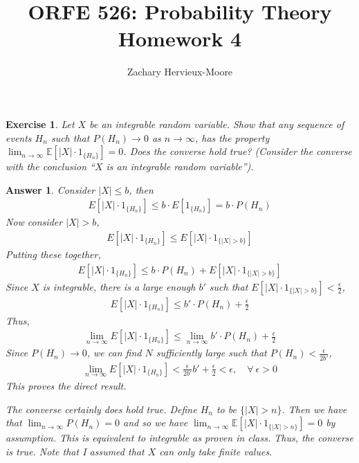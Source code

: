\documentclass[12pt]{article}
\title{ORFE 526: Probability Theory \\ Homework 4}
\author{Zachary Hervieux-Moore}
\date{\displaydate{date}}
\theoremstyle{colon}
\newtheorem{exercise}{Exercise}
\newtheorem*{answer}{Answer}
\begin{document}
\maketitle

\clearpage

\begin{exercise}
  Let $X$ be an integrable random variable. Show that any sequence of events $H_n$ such that $P(H_n) \rightarrow 0$ as $n \rightarrow \infty$, has the property $\lim_{n \rightarrow \infty} \mathbb{E}[\lvert X \rvert \cdot 1_{\{H_n\}}] = 0$. Does the converse hold true? (Consider the converse with the conclusion ``$X$ is an integrable random variable'').
\end{exercise}

\begin{answer}
  Consider $\lvert X \rvert \leq b$, then
  \begin{gather*}
    E [\lvert X \rvert \cdot 1_{\{H_n\}} ] \leq b \cdot E [ 1_{\{H_n\}} ] = b \cdot P(H_n)
  \end{gather*}
  Now consider $\lvert X \rvert > b$,
  \begin{gather*}
    E [\lvert X \rvert \cdot 1_{\{H_n\}} ] \leq E[ \lvert X \rvert \cdot 1_{\{ \vert X \rvert > b \} }]
  \end{gather*}
  Putting these together,
  \begin{gather*}
    E [\lvert X \rvert \cdot 1_{\{H_n\}} ] \leq b \cdot P(H_n) + E[ \lvert X \rvert \cdot 1_{\{ \vert X \rvert > b \} }]
  \end{gather*}
  Since $X$ is integrable, there is a large enough $b'$ such that $E[ \lvert X \rvert \cdot 1_{\{ \vert X \rvert > b \} }] < \frac{\epsilon}{2}$,
  \begin{gather*}
    E [\lvert X \rvert \cdot 1_{\{H_n\}} ] \leq b' \cdot P(H_n) + \frac{\epsilon}{2}
  \end{gather*}
  Thus,
  \begin{gather*}
    \lim_{n \rightarrow \infty} E [\lvert X \rvert \cdot 1_{\{H_n\}} ] \leq \lim_{n \rightarrow \infty} b' \cdot P(H_n) + \frac{\epsilon}{2}
  \end{gather*}
  Since $P(H_n) \rightarrow 0$, we can find $N$ sufficiently large such that $P(H_n) < \frac{\epsilon}{2b'}$,
  \begin{gather*}
    \lim_{n \rightarrow \infty} E [\lvert X \rvert \cdot 1_{\{H_n\}} ] < \frac{\epsilon}{2b'} b' + \frac{\epsilon}{2} < \epsilon, \quad \forall \ \epsilon > 0
  \end{gather*}
  This proves the direct result.

  The converse certainly does hold true. Define $H_n$ to be $\{\lvert X \rvert > n\}$. Then we have that $\lim_{n \rightarrow \infty} P(H_n) = 0$ and so we have $\lim_{n \rightarrow \infty} \mathbb{E}[\lvert X \rvert \cdot 1_{\{\lvert X \rvert > n\}}] = 0$ by assumption. This is equivalent to integrable as proven in class. Thus, the converse is true. Note that I assumed that $X$ can only take finite values.
\end{answer}
\end{document}
